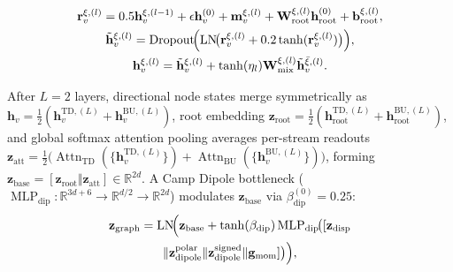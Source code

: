 \documentclass[conference]{IEEEtran}
\begin{document}
\begin{multline}
\mathbf{r}_v^{\xi,(l)} = 0.5 \mathbf{h}_v^{\xi,(l-1)} + \epsilon \mathbf{h}_v^{(0)} + \mathbf{m}_v^{\xi,(l)} + \mathbf{W}_{\text{root}}^{\xi,(l)} \mathbf{h}_{\text{root}}^{(0)} + \mathbf{b}_{\text{root}}^{\xi,(l)}, \\
\tilde{\mathbf{h}}_v^{\xi,(l)} = \operatorname{Dropout}\!\Bigl(\operatorname{LN}\!\bigl(\mathbf{r}_v^{\xi,(l)} + 0.2\tanh(\mathbf{r}_v^{\xi,(l)})\bigr)\Bigr), \\
\mathbf{h}_v^{\xi,(l)} = \tilde{\mathbf{h}}_v^{\xi,(l)} + \tanh(\eta_l) \mathbf{W}_{\text{mix}}^{\xi,(l)} \tilde{\mathbf{h}}_v^{\bar{\xi},(l)}.
\end{multline}

After $L=2$ layers, directional node states merge symmetrically as $\mathbf{h}_v = \tfrac{1}{2}(\mathbf{h}_v^{\text{TD},(L)} + \mathbf{h}_v^{\text{BU},(L)})$, root embedding $\mathbf{z}_{\text{root}} = \tfrac{1}{2}(\mathbf{h}_{\text{root}}^{\text{TD},(L)} + \mathbf{h}_{\text{root}}^{\text{BU},(L)})$, and global softmax attention pooling averages per-stream readouts $\mathbf{z}_{\text{att}} = \tfrac{1}{2}\bigl(\operatorname{Attn}_{\text{TD}}(\{\mathbf{h}_v^{\text{TD},(L)}\}) + \operatorname{Attn}_{\text{BU}}(\{\mathbf{h}_v^{\text{BU},(L)}\})\bigr)$, forming $\mathbf{z}_{\text{base}} = [\mathbf{z}_{\text{root}} \Vert \mathbf{z}_{\text{att}}] \in \mathbb{R}^{2d}$. A Camp Dipole bottleneck ($\operatorname{MLP}_{\text{dip}}\!: \mathbb{R}^{3d+6} \to \mathbb{R}^{d/2} \to \mathbb{R}^{2d}$) modulates $\mathbf{z}_{\text{base}}$ via $\beta_{\text{dip}}^{(0)} = 0.25$:
\begin{multline*}
\mathbf{z}_{\text{graph}} = \operatorname{LN}\!\Bigl(\mathbf{z}_{\text{base}} + \tanh(\beta_{\text{dip}})\operatorname{MLP}_{\text{dip}}\!\bigl([\mathbf{z}_{\text{disp}} \\
\Vert \mathbf{z}_{\text{dipole}}^{\text{polar}} \Vert \mathbf{z}_{\text{dipole}}^{\text{signed}} \Vert \mathbf{g}_{\text{mom}}]\bigr)\Bigr),
\end{multline*}
\end{document}
